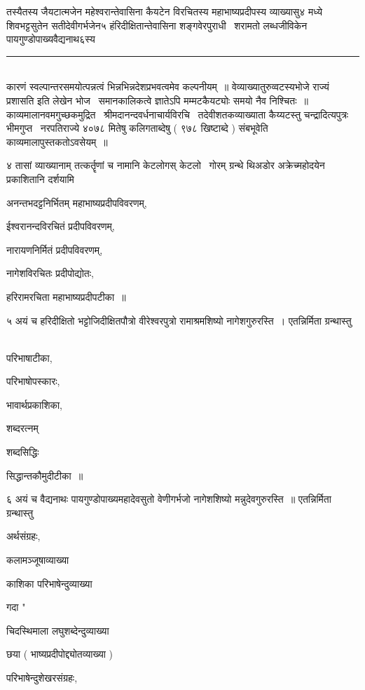 \documentclass[11pt, openany]{book}
\begin{document}
\begin{multicols}{2}
\columnbreak

तस्यैतस्य जैयटात्मजेन महेश्वरान्तेवासिना कैयटेन विरचितस्य महाभाष्यप्रदीपस्य व्याख्यासु४ मध्ये शिवभट्टसुतेन सतीदेवीगर्भजेन५ हंरिदीक्षितान्तेवासिना शङ्गवेरपुराधी \textendash\ शरामतो लब्धजीविकेन पायगुण्डोपाख्यवैद्यनाथ६स्य

\noindent
\rule{1\linewidth}{0.5pt}\\

\noindent
कारणं स्वल्पान्तरसमयोत्पन्नत्वं भिन्नभिन्नदेशप्रभवत्वमेव कल्पनीयम्~॥ वेव्याख्यातुरुव्वटस्य{\qt भोजे राज्यं प्रशासति} इति लेखेन भोज \textendash\ समानकालिकत्वे ज्ञातेऽपि मम्मटकैयट्योः समयो नैव निश्चितः~॥\\

काव्यमालानवमगुच्छकमुद्रित \textendash\ श्रीमदानन्दवर्धनाचार्यविरचि \textendash\ तदेवीशतकव्याख्याता कैय्यटस्तु चन्द्रादित्यपुत्रः भीमगुप्त \textendash\ नरपतिराज्ये ४०७८ मितेषु कलिगताब्देषु ( ९७८ खिष्टाब्दे ) संबभूवेति काव्यमालापुस्तकतोऽवसेयम्~॥

४ तासां व्याख्यानाम् तत्कर्तॄणां च नामानि केटलोगस् केटलो \textendash\ गोरम् ग्रन्थे थिअडोर अक्रेच्महोदयेन प्रकाशितानि दर्शयामि \textendash\ 

अनन्तभदट्टनिर्भितम् महाभाष्यप्रदीपविवरणम्, 

ईश्वरानन्दविरचितं प्रदीपविवरणम्, 

नारायणनिर्मितं प्रदीपविवरणम्, 

नागेशविरचितः प्रदीपोद्योतः, 

हरिरामरचिता महाभाष्यप्रदीपटीका~॥

५ अयं च हरिदीक्षितो भट्टोजिदीक्षितपौत्रो वीरेश्वरपुत्रो रामाश्रमशिष्यो नागेशगुरुरस्ति~। एतन्निर्मिता ग्रन्थास्तु \textendash\ 

परिभाषाटीका, 

परिभाषोपस्कारः, 

भावार्थप्रकाशिका, 

शब्दरत्नम्

शब्दसिद्धिः 

सिद्धान्तकौमुदीटीका~॥ 

६ अयं च वैद्यनाथः पायगुण्डोपाख्यमहादेवसुतो वेणीगर्भजो नागेशशिष्यो मन्नुदेवगुरुरस्ति~॥ एतन्निर्मिता ग्रन्थास्तु \textendash\ 

अर्थसंग्रहः, 

कलामञ्जूषाव्याख्या 

काशिका परिभाषेन्दुव्याख्या 

गदा "

चिदस्थिमाला लघुशब्देन्दुव्याख्या 

छया ( भाष्यप्रदीपोद्द्योतव्याख्या ) 

परिभाषेन्दुशेखरसंग्रहः, 
\end{multicols}
\end{document}
